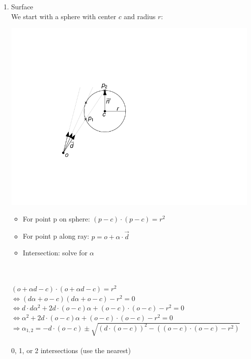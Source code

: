 \documentclass[utf8,stillsansserifmath,fleqn,t]{beamer}
\newcommand{\labelname}[1]{\def\insertenumlabel{#1}\usebeamertemplate{enumerate item}}
\begin{document}
\begin{frame}
\frametitle{\insertsection}
\begin{enumerate}
\item[\labelname{3}] Surface\\
We start with a sphere with center $c$ and radius $r$:\\
\begin{minipage}{.24\textwidth}
\includegraphics[width=\textwidth]{./fig/sphere.pdf}
\end{minipage}\hfill
\begin{minipage}{.64\textwidth}
\begin{itemize}
\item For point p on sphere: $(p-c)\cdot(p-c) = r^2$
\item For point p along ray: $p = o + \alpha \cdot \vec{d}$
\item Intersection: solve for $\alpha$
\end{itemize}
\end{minipage}\\~\\[.5ex]
    $(o + \alpha d - c)\cdot(o + \alpha d -c) = r^2$\\
    $\Leftrightarrow (d\alpha + o-c)(d\alpha + o-c) -r^2 = 0$\\
    $\Leftrightarrow d\cdot d \alpha^2 + 2d\cdot(o-c)\alpha + (o-c)\cdot(o-c)-r^2 = 0$\\
    $\Leftrightarrow \alpha^2 + 2d\cdot(o-c)\alpha + (o-c)\cdot(o-c)-r^2 = 0$\\
    $\Rightarrow \alpha_{1,2} = -d\cdot(o-c) \pm \sqrt{(d\cdot(o-c))^2 - ((o-c)\cdot(o-c)-r^2)}$\\
    ~\\
0, 1, or 2 intersections (use the nearest)
\end{enumerate}
\end{frame}
\end{document}
